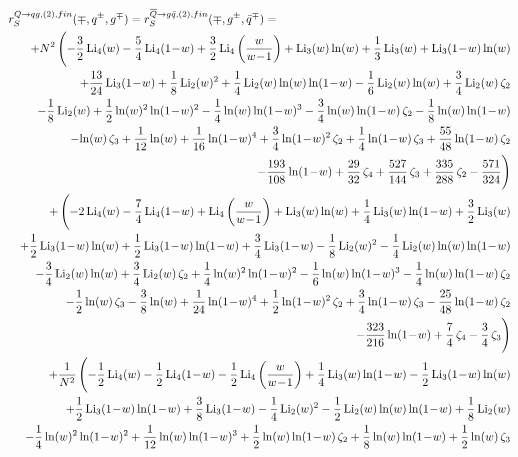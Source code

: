 \documentclass[paper,notoc,nohyper]{JHEP3}
\def\lx{\ln(w)}
\def\ly{\ln(1\!-\!w)}
\def\Libx{{\rm Li}_2(w)}
\def\Licx{{\rm Li}_3(w)}
\def\Lidx{{\rm Li}_4(w)}
\def\Licy{{\rm Li}_3(1\!-\!w)}
\def\Lidy{{\rm Li}_4(1\!-\!w)}
\def\Lidz{{\rm Li}_4\left(\frac{w}{w\!-\!1}\right)}
\begin{document}
\begin{eqnarray}
\label{eq:r2qgpm}
\lefteqn{r_{S}^{Q \to qg,(2),fin}(\mp,q^{\pm},g^{\mp})=
r_{S}^{\overline{Q} \to g\bar q,(2),fin}(\mp,g^{\pm},\bar{q}^{\mp})=
}\nonumber \\&&
+{N^2}\,\Biggl (-{3\over 2}\,{\Lidx}-{5\over 4}\,{\Lidy}+{3\over 2}\,{\Lidz}+{\Licx}\,{\lx}+{1\over 3}\,{\Licx}+{\Licy}\,{\lx}\nonumber \\&&
+{13\over 24}\,{\Licy}+{1\over 8}\,{\Libx^2}+{1\over 4}\,{\Libx}\,{\lx}\,{\ly}-{1\over 6}\,{\Libx}\,{\lx}+{3\over 4}\,{\Libx}\,{\zeta_2}\nonumber \\&&
-{1\over 8}\,{\Libx}+{1\over 2}\,{\lx^2}\,{\ly^2}-{1\over 4}\,{\lx}\,{\ly^3}-{3\over 4}\,{\lx}\,{\ly}\,{\zeta_2}-{1\over 8}\,{\lx}\,{\ly}\nonumber \\&&
-{\lx}\,{\zeta_3}+{1\over 12}\,{\lx}+{1\over 16}\,{\ly^4}+{3\over 4}\,{\ly^2}\,{\zeta_2}+{1\over 4}\,{\ly}\,{\zeta_3}+{55\over 48}\,{\ly}\,{\zeta_2}\nonumber \\&&
-{193\over 108}\,{\ly}+{29\over 32}\,{\zeta_4}+{527\over 144}\,{\zeta_3}+{335\over 288}\,{\zeta_2}-{571\over 324}\Biggr )\nonumber \\&&
+\,\Biggl (-{2}\,{\Lidx}-{7\over 4}\,{\Lidy}+{\Lidz}+{\Licx}\,{\lx}+{1\over 4}\,{\Licx}\,{\ly}+{3\over 2}\,{\Licx}\nonumber \\&&
+{1\over 2}\,{\Licy}\,{\lx} +{1\over 2}\,{\Licy}\,{\ly}+{3\over 4}\,{\Licy}-{1\over 8}\,{\Libx^2}-{1\over 4}\,{\Libx}\,{\lx}\,{\ly}\nonumber \\&&
-{3\over 4}\,{\Libx}\,{\lx}+{3\over 4}\,{\Libx}\,{\zeta_2}+{1\over 4}\,{\lx^2}\,{\ly^2}-{1\over 6}\,{\lx}\,{\ly^3}-{1\over 4}\,{\lx}\,{\ly}\,{\zeta_2}\nonumber \\&&
-{1\over 2}\,{\lx}\,{\zeta_3}-{3\over 8}\,{\lx}+{1\over 24}\,{\ly^4}+{1\over 2}\,{\ly^2}\,{\zeta_2}+{3\over 4}\,{\ly}\,{\zeta_3}-{25\over 48}\,{\ly}\,{\zeta_2}\nonumber \\&&
-{323\over 216}\,{\ly}+{7\over 4}\,{\zeta_4}-{3\over 4}\,{\zeta_3}\Biggr )\nonumber \\&&
+{1\over N^2}\,\Biggl (-{1\over 2}\,{\Lidx}-{1\over 2}\,{\Lidy}-{1\over 2}\,{\Lidz}+{1\over 4}\,{\Licx}\,{\ly}-{1\over 2}\,{\Licy}\,{\lx}\nonumber \\&&
+{1\over 2}\,{\Licy}\,{\ly}+{3\over 8}\,{\Licy}-{1\over 4}\,{\Libx^2}-{1\over 2}\,{\Libx}\,{\lx}\,{\ly}+{1\over 8}\,{\Libx}\nonumber \\&&
-{1\over 4}\,{\lx^2}\,{\ly^2}+{1\over 12}\,{\lx}\,{\ly^3}+{1\over 2}\,{\lx}\,{\ly}\,{\zeta_2}+{1\over 8}\,{\lx}\,{\ly}+{1\over 2}\,{\lx}\,{\zeta_3}\nonumber \\&&

\end{eqnarray}
\end{document}
